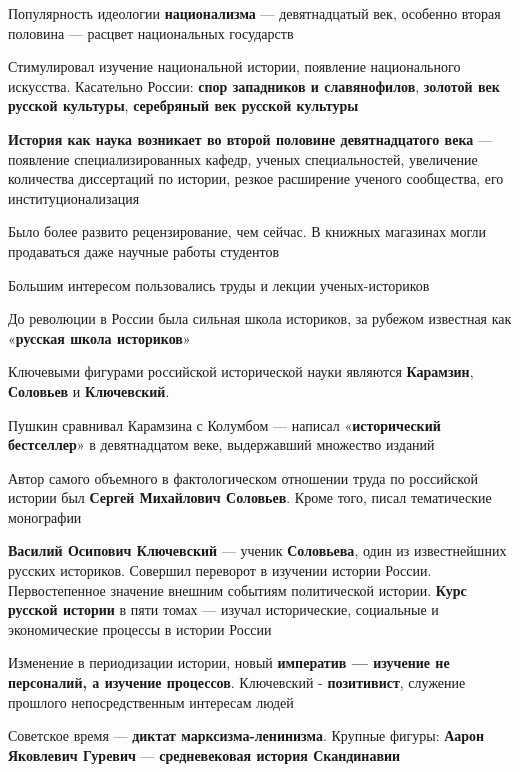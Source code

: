 \documentclass{article}
\begin{document}
Популярность идеологии \textbf{национализма} — девятнадцатый век, особенно вторая половина — расцвет национальных государств

Стимулировал изучение национальной истории, появление национального искусства. Касательно России: \textbf{спор западников и славянофилов}, \textbf{золотой век русской культуры}, \textbf{серебряный век русской культуры}

\hfill

\textbf{История как наука возникает во второй половине девятнадцатого века} — появление специализированных кафедр, ученых специальностей, увеличение количества диссертаций по истории, резкое расширение ученого сообщества, его институционализация

Было более развито рецензирование, чем сейчас. В книжных магазинах могли продаваться даже научные работы студентов

Большим интересом пользовались труды и лекции ученых-историков

До революции в России была сильная школа историков, за рубежом известная как «\textbf{русская школа историков}»

\hfill

Ключевыми фигурами российской исторической науки являются \textbf{Карамзин}, \textbf{Соловьев} и \textbf{Ключевский}.

Пушкин сравнивал Карамзина с Колумбом — написал «\textbf{исторический бестселлер}» в девятнадцатом веке, выдержавший множество изданий

Автор самого объемного в фактологическом отношении труда по российской истории был \textbf{Сергей Михайлович Соловьев}. Кроме того, писал тематические монографии

\hfill

\textbf{Василий Осипович Ключевский} — ученик \textbf{Соловьева}, один из известнейшних русских историков. Совершил переворот в изучении истории России. Первостепенное значение внешним событиям политической истории. \textbf{Курс русской истории} в пяти томах — изучал исторические, социальные и экономические процессы в истории России

Изменение в периодизации истории, новый \textbf{императив — изучение не персоналий, а изучение процессов}. Ключевский - \textbf{позитивист}, служение прошлого непосредственным интересам людей

\hfill

Советское время — \textbf{диктат марксизма-ленинизма}. Крупные фигуры: \textbf{Аарон Яковлевич Гуревич} — \textbf{средневековая история Скандинавии}
\end{document}
